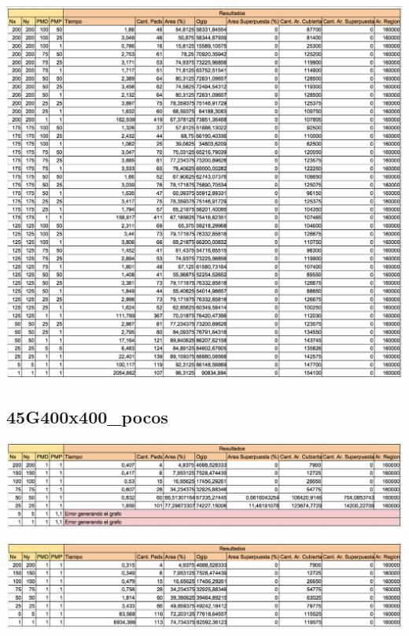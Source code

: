 \begin{center}
\includegraphics[width=1\textwidth]{imagenes/GML_0G400x400_pocos}
\end{center}

\subsection{45G400x400\_pocos}

\begin{center}
\includegraphics[width=1\textwidth]{imagenes/S_45G400x400_pocos}
\end{center}

\begin{center}
\includegraphics[width=1\textwidth]{imagenes/G_45G400x400_pocos}
\end{center}

